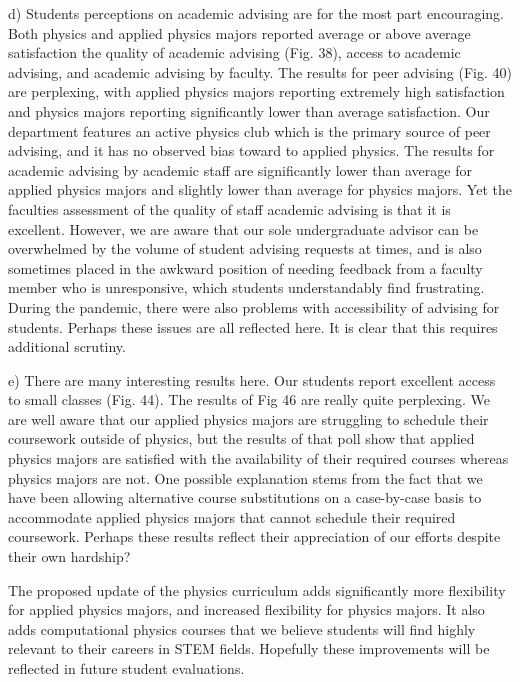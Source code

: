 \documentclass[12pt]{article}
\begin{document}
d) Students perceptions on academic advising are for the most part encouraging.  Both physics and applied physics majors reported average or above average satisfaction the quality of academic advising (Fig. 38), access to academic advising, and academic advising by faculty.
The results for peer advising (Fig. 40) are perplexing, with applied physics majors reporting extremely high satisfaction and physics majors reporting significantly lower than average satisfaction.  Our department features an active physics club which is the primary source of peer advising, and it has no observed bias toward to applied physics.  The results for academic advising by academic staff are significantly lower than average for applied physics majors and slightly lower than average for physics majors.  Yet the faculties assessment of the quality of staff academic advising is that it is excellent.  However, we are aware that our sole undergraduate advisor can be overwhelmed by the volume of student advising requests at times, and is also sometimes placed in the awkward position of needing feedback from a faculty member who is unresponsive, which students understandably find frustrating.  During the pandemic, there were also problems with accessibility of advising for students.  Perhaps these issues are all reflected here.  It is clear that this requires additional scrutiny.

 




e) There are many interesting results here.  Our students report excellent access to small classes (Fig. 44).  The results of Fig 46 are really quite perplexing.  We are well aware that our applied physics majors are struggling to schedule their coursework outside of physics, but the results of that poll show that applied physics majors are satisfied with the availability of their required courses whereas physics majors are not.  One possible explanation stems from the fact that we have been allowing alternative course substitutions on a case-by-case basis to accommodate applied physics majors that cannot schedule their required coursework.  Perhaps these results reflect their appreciation of our efforts despite their own hardship?

The proposed update of the physics curriculum adds significantly more flexibility for applied physics majors, and increased flexibility for physics majors.  It also adds computational physics courses that we believe students will find highly relevant to their careers in STEM fields.  Hopefully these improvements will be reflected in future student evaluations.
\end{document}
